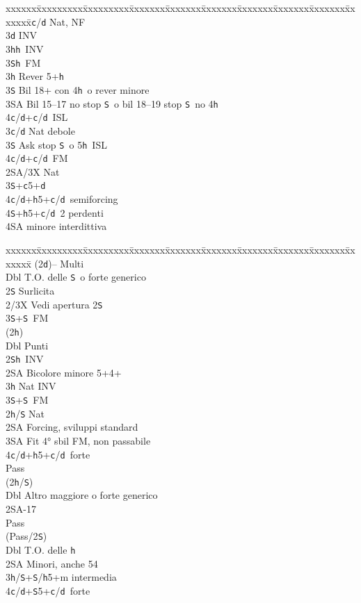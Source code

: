 \documentclass[a4paper,italian]{article}
\newcommand{\BS}{\small{\texttt{S}}}
\newcommand{\BC}{\small{\texttt{c}}}
\newcommand{\BD}{\small{\texttt{d}}}
\newcommand{\BH}{\small{\texttt{h}}}
\newenvironment{bidtable}
{\begin{tabbing}

    xxxxxx\=xxxxxxxxx\=xxxxxxxxx\=xxxxxxx\=xxxxxxx\=xxxxxxx\=xxxxxxx\=xxxxxxx\=xxxxxxx\=xxxxxxx\=\kill}
{\end{tabbing} }%
\begin{document}
\begin{multicols}{2}
\begin{bidtable}
        3\BC/\BD \> Nat, NF\+\\
        3\BD\> INV\\
        3\BH{}\BH\ INV\\
        3\BS{}\BH\ FM\-\\
        3\BH\> Rever 5+\BH\\
        3\BS\> Bil 18+ con 4\BH\ o rever minore\\
        3\small{SA}\> Bil 15--17 no stop \BS\ o bil 18--19 stop \BS\ no 4\BH\\
        4\BC/\BD{}+\BC/\BD\ ISL\-\\
        3\BC/\BD\> Nat debole\\
        3\BS\> Ask stop \BS\ o 5\BH\ ISL\\
        4\BC/\BD{}+\BC/\BD\ FM\-\\
        2\small{SA}/3X\>\> Nat\\
        3\BS{}+\BC5+\BD\\
        4\BC/\BD{}+\BH5+\BC/\BD\ semiforcing\\
        4\BS{}+\BH5+\BC/\BD\ 2 perdenti\\
        4\small{SA} minore interdittiva
    \end{bidtable}
    \begin{bidtable}
        (2\BD)--\> Multi\+\\
        Dbl\> T.O. delle \BS\ o forte generico\+\\
        2\BS\> Surlicita\\
        2/3X \> Vedi apertura 2\BS\\
        3\BS{}+\BS\ FM\\
        (2\BH)\+\\
        Dbl\> Punti\\
        2\BS{}\BH\ INV\\
        2\small{SA}\> Bicolore minore 5+4+\\
        3\BH\> Nat INV\\
        3\BS{}+\BS\ FM\-\-\\
        2\BH/\BS\> Nat\+\\
        2\small{SA}\> Forcing, sviluppi standard\\
        3\small{SA}\> Fit 4° sbil FM, non passabile\-\\
        4\BC/\BD{}+\BH5+\BC/\BD\ forte\\
        Pass\+\\
        (2\BH/\BS)\+\\
        Dbl\> Altro maggiore o forte generico\\
        2\small{SA}-17\\
        Pass\+\\
        (Pass/2\BS)\+\\
        Dbl\> T.O. delle \BH\\
        2\small{SA}\> Minori, anche 54\\
        3\BH/\BS{}+\BS/\BH5+m intermedia\\
        4\BC/\BD{}+\BS5+\BC/\BD\ forte\\


\end{bidtable}
\end{multicols}
\end{document}
